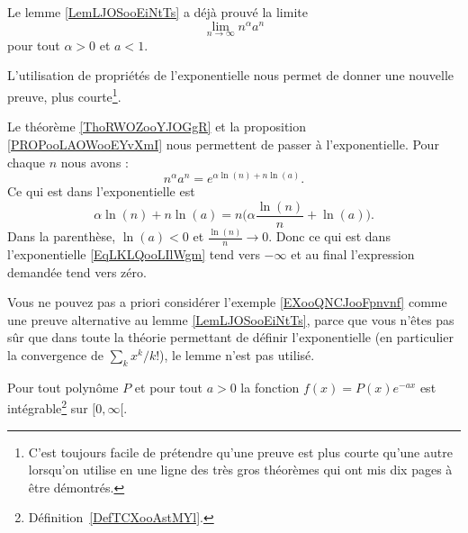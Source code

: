 \begin{example}     \label{EXooQNCJooFpnvnf}
   Le lemme \ref{LemLJOSooEiNtTs} a déjà prouvé la limite 
    \begin{equation}
        \lim_{n\to \infty} n^{\alpha}a^n
    \end{equation}
    pour tout \( \alpha>0\) et \( a<1\).

    L'utilisation de propriétés de l'exponentielle nous permet de donner une nouvelle preuve, plus courte\footnote{C'est toujours facile de prétendre qu'une preuve est plus courte qu'une autre lorsqu'on utilise en une ligne des très gros théorèmes qui ont mis dix pages à être démontrés.}.

    Le théorème \ref{ThoRWOZooYJOGgR} et la proposition \ref{PROPooLAOWooEYvXmI} nous permettent de passer à l'exponentielle. Pour chaque \( n\) nous avons :
    \begin{equation}        \label{EqLKLQooLIlWgm}
        n^{\alpha}a^n= e^{\alpha\ln(n)+n\ln(a)}.
    \end{equation}
    Ce qui est dans l'exponentielle est
    \begin{equation}
        \alpha\ln(n)+n\ln(a)=n\big(\alpha \frac{ \ln(n) }{ n }+\ln(a) \big).
    \end{equation}
    Dans la parenthèse, \( \ln(a)<0\) et \( \frac{ \ln(n) }{ n }\to 0\). Donc ce qui est dans l'exponentielle \eqref{EqLKLQooLIlWgm} tend vers \( -\infty\) et au final l'expression demandée tend vers zéro.
\end{example}

\begin{remark}
    Vous ne pouvez pas a priori considérer l'exemple \ref{EXooQNCJooFpnvnf} comme une preuve alternative au lemme \ref{LemLJOSooEiNtTs}, parce que vous n'êtes pas sûr que dans toute la théorie permettant de définir l'exponentielle (en particulier la convergence de \( \sum_kx^k/k!\)), le lemme n'est pas utilisé.
\end{remark}

\begin{proposition} \label{PropBQGBooHxNrrf}
    Pour tout polynôme \( P\) et pour tout \( a>0\) la fonction \( f(x)=P(x) e^{-ax}\) est intégrable\footnote{Définition~\ref{DefTCXooAstMYl}.} sur \( \mathopen[ 0 , \infty [\).
\end{proposition}


